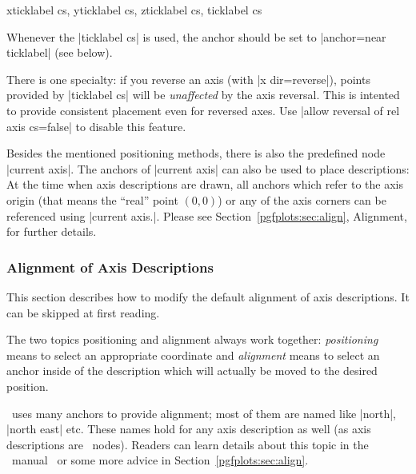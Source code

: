 \begin{coordinatesystemlist}{%
	xticklabel cs,%
	yticklabel cs,%
	zticklabel cs,
	ticklabel cs}
\begin{codeexample}[width=4cm]
\end{codeexample}

	Whenever the |ticklabel cs| is used, the anchor should be set to |anchor=near ticklabel| (see below).

	There is one specialty: if you reverse an axis (with |x dir=reverse|), points provided by |ticklabel cs| will be \emph{unaffected} by the axis reversal. This is intented to provide consistent placement even for reversed axes. Use |allow reversal of rel axis cs=false| to disable this feature.
\end{coordinatesystemlist}


Besides the mentioned positioning methods, there is also the predefined node |current axis|. The anchors of |current axis| can also be used to place descriptions: At the time when axis descriptions are drawn, all anchors which refer to the axis origin (that means the ``real'' point $(0,0)$) or any of the axis corners can be referenced using |current axis.|. Please see Section~\ref{pgfplots:sec:align}, Alignment, for further details.

\subsubsection{Alignment of Axis Descriptions}
This section describes how to modify the default alignment of axis descriptions. It can be skipped at first reading.

The two topics positioning and alignment always work together: \emph{positioning} means to select an appropriate coordinate and \emph{alignment} means to select an anchor inside of the description which will actually be moved to the desired position.

\Tikz\ uses many anchors to provide alignment; most of them are named like |north|, |north east| etc. These names hold for any axis description as well (as axis descriptions are \Tikz\ nodes). Readers can learn details about this topic in the \Tikz\ manual~\cite{tikz} or some more advice in Section~\ref{pgfplots:sec:align}.

